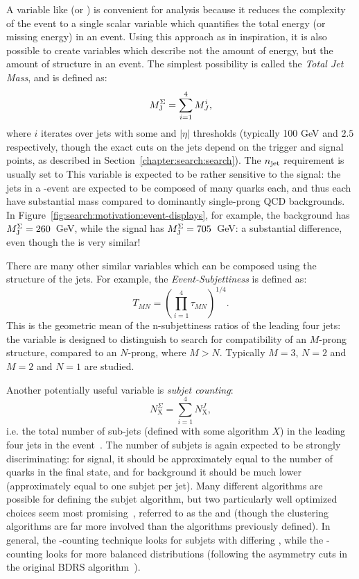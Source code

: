 A variable like \Ht (or \met) is convenient for analysis because it reduces the complexity of the event to a single scalar variable which quantifies the total energy (or missing energy) in an event. Using this approach as in inspiration, it is also possible to create variables which describe not the amount of energy, but the amount of structure in an event.  The simplest possibility is called the \textit{Total Jet Mass}, and is defined as:
%
\begin{equation}
M_{\textrm{J}}^{\Sigma} = \sum_{i=1}^4 M_J^i,
\end{equation}
%
where $i$ iterates over jets with some \pt and $|\eta|$ thresholds (typically 100 GeV and $2.5$ respectively, though the exact \pt cuts on the jets depend on the trigger and signal points, as described in Section~\ref{chapter:search:search}). The $n_{\rm jet}$ requirement is usually set to  This variable is expected to be rather sensitive to the signal: the \largeR jets in a \gl-\gl event are expected to be composed of many quarks each, and thus each have substantial mass compared to dominantly single-prong QCD backgrounds. In Figure~\ref{fig:search:motivation:event-displays}, for example, the background has $M_{\textrm{J}}^{\Sigma} = 260$~GeV, while the signal has $M_{\textrm{J}}^{\Sigma} = 705$~GeV: a substantial difference, even though the \HT is very similar!

There are many other similar variables which can be composed using the structure of the \largeR jets. For example, the \textit{Event-Subjettiness} is defined as:
%
\begin{equation}
T_{MN} = \left(\prod_{i=1}^4 \tau_{MN}\right)^{1/4}.
\end{equation}
%
This is the geometric mean of the n-subjettiness ratios of the leading four jets: the variable is designed to distinguish to search for compatibility of an $M$-prong structure, compared to an $N$-prong, where $M>N$. Typically $M=3$, $N=2$ and $M=2$ and $N=1$ are studied.

Another potentially useful variable is \textit{subjet counting}:
%
\begin{equation}
N_\mathrm{X}^\Sigma = \sum_{i=1}^4 N_\mathrm{X}^J,
\end{equation}
%
i.e. the total number of sub-jets (defined with some algorithm $X$) in the leading four jets in the event~\cite{SubjetCounting}. The number of subjets is again expected to be strongly discriminating: for signal, it should be approximately equal to the number of quarks in the final state, and for background it should be much lower (approximately equal to one subjet per jet). Many different algorithms are possible for defining the subjet algorithm, but two particularly well optimized choices seem most promising~\cite{SubjetCounting}, referred to as the \kt and \ca (though the clustering algorithms are far more involved than the algorithms previously defined). In general, the \kt-counting technique looks for subjets with differing \pt, while the \ca-counting looks for more balanced \pt distributions (following the asymmetry cuts in the original BDRS algorithm~\cite{BDRS}). 


